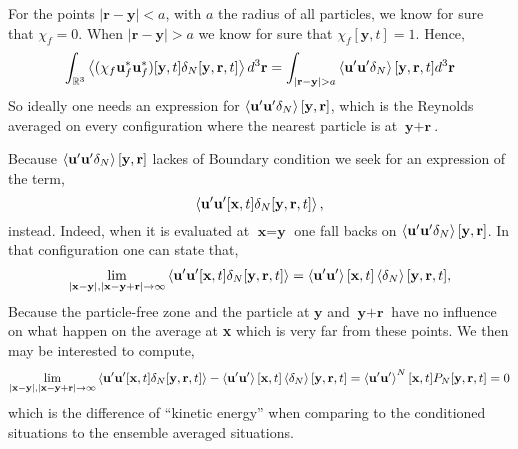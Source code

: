 For the points $|\textbf{r}- \textbf{y}|<a$, with $a$ the radius of all particles, we know for sure that $\chi_f = 0$. 
When $|\textbf{r}- \textbf{y}|>a$ we know for sure that $\chi_f[\textbf{y},t]= 1$. 
Hence, 
\begin{equation}
    \int_{\mathbb{R}^3}
    \avg{(\chi_f \textbf{u}^*_f\textbf{u}^*_f) [\textbf{y},t] \delta_N [\textbf{y},\textbf{r},t]}
    d^3 \textbf{r}
    =
    \int_{|\textbf{r}-\textbf{y}|>a}
    \avg{\textbf{u}'\textbf{u}' \delta_N }[\textbf{y},\textbf{r},t]
    d^3 \textbf{r}
\end{equation}
So ideally one needs an expression for $\left<\textbf{u}'\textbf{u}' \delta_N \right>[\textbf{y},\textbf{r}]$, which is the Reynolds averaged on every configuration where the nearest particle is at $\textbf{y} +  \textbf{r}$.

Because $\left<\textbf{u}'\textbf{u}' \delta_N \right>[\textbf{y},\textbf{r}]$ lackes of Boundary condition we seek for an expression of the term, 
\begin{equation}
    \left<\textbf{u}'\textbf{u}'[\textbf{x},t] \delta_N[\textbf{y},\textbf{r},t] \right>,
\end{equation}
instead. 
Indeed, when it is evaluated at $\textbf{x} = \textbf{y}$ one fall backs on $\left<\textbf{u}'\textbf{u}' \delta_N \right>[\textbf{y},\textbf{r}]$. 
In that configuration one can state that,
\begin{equation}
    \lim_{|\textbf{x}- \textbf{y}| ,  |\textbf{x}- \textbf{y}+\textbf{r}|\to\infty }
    \left<\textbf{u}'\textbf{u}'[\textbf{x},t] \delta_N[\textbf{y},\textbf{r},t] \right>
    = 
    \left<\textbf{u}'\textbf{u}'\right>[\textbf{x},t]
    \left<\delta_N\right>[\textbf{y},\textbf{r},t] ,
\end{equation}
Because the particle-free zone and the particle at $\textbf{y}$ and $\textbf{y}+\textbf{r}$ have no influence on what happen on the average at \textbf{x} which is very far from these points. 
We then may be interested to compute, 
\begin{equation}
    \lim_{|\textbf{x}- \textbf{y}| ,  |\textbf{x}- \textbf{y}+\textbf{r}|\to\infty }
    \left<\textbf{u}'\textbf{u}'[\textbf{x},t] \delta_N[\textbf{y},\textbf{r},t] \right>
    - \left<\textbf{u}'\textbf{u}'\right>[\textbf{x},t]
    \left<\delta_N\right>[\textbf{y},\textbf{r},t] 
    = \left<\textbf{u}'\textbf{u}'\right>^N[\textbf{x},t] P_N[\textbf{y},\textbf{r},t] = 0
\end{equation}
which is the difference of ``kinetic energy'' when comparing to the conditioned situations to the ensemble averaged situations. 

